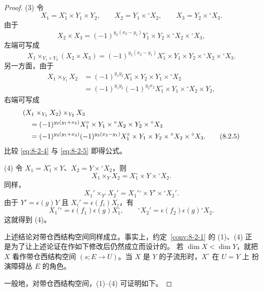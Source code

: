 \begin{proof}
\textup{(3)} 令
\[
 X_1=X_1^\circ\times Y_1\times Y_2,
 \qquad X_2=Y_1\times{}^\circ X_2,
 \qquad X_3=Y_2\times{}^\circ X_3.
\]
由于
\[
 X_2\times X_3
 =(-1)^{y_2(x_2-y_1)}
 Y_1\times Y_2\times{}^\circ X_2\times{}^\circ X_3,
\]
左端可写成
\begin{equation}
 X_1\times_{Y_1\times Y_2}(X_2\times X_3)
 =(-1)^{y_2(x_2-y_1)}
 X_1^\circ\times Y_1\times Y_2
 \times{}^\circ X_2\times{}^\circ X_3.
 \tag{8.2.4}\label{eq:8-2-4}
\end{equation}
另一方面，由于
\[
\begin{aligned}
 X_1\times_{Y_1}X_2
 &=(-1)^{y_1y_2}
 X_1^\circ\times Y_2\times Y_1\times{}^\circ X_2\\
 &=(-1)^{y_1y_2}(-1)^{y_2x_2}
 X_1^\circ\times Y_1\times{}^\circ X_2\times Y_2,
\end{aligned}
\]
右端可写成
\begin{align}
 &(X_1\times_{Y_1}X_2)\times_{Y_2}X_3\notag\\
 &\quad=(-1)^{y_2(y_1+x_2)}
 X_1^\circ\times Y_1\times{}^\circ X_2\times Y_2\times{}^\circ X_3
 \notag\\
 &\quad=(-1)^{y_2(y_1+x_2)}(-1)^{y_2(x_2-y_1)}
 X_1^\circ\times Y_1\times Y_2
 \times{}^\circ X_2\times{}^\circ X_3.
 \tag{8.2.5}\label{eq:8-2-5}
\end{align}
比较 \eqref{eq:8-2-4} 与 \eqref{eq:8-2-5} 即得公式。

\textup{(4)} 令
$X_1=X_1^\circ\times Y$、$X_2=Y\times{}^\circ X_2$，则
\[
 X_1\times_YX_2=X_1^\circ\times Y\times{}^\circ X_2.
\]
同样，
\[
 X_1'\times_{Y'}X_2'=X_1'{}^\circ\times Y'\times{}^\circ X_2'.
\]
由于 $Y'=\epsilon(g)Y$ 且 $X_i'=\epsilon(f_i)X_i$，有
\[
 X_1'{}^\circ=\epsilon(f_1)\epsilon(g)X_1^\circ,
 \qquad
 {}^\circ X_2'=\epsilon(f_2)\epsilon(g){}^\circ X_2.
\]
这就得到 (4)。

上述结论对带仓西结构空间同样成立。事实上，约定~\ref{conv:8-2-1}
的 (1)、(4) 正是为了让上述论证在作如下修改后仍然成立而设计的。
若 $\dim X<\dim Y$，就把 $X$ 看作带仓西结构空间
$(s;E\to U)$。当 $X$ 是 $Y$ 的子流形时，$X^\circ$ 在 $U=Y$ 上
扮演障碍丛 $E$ 的角色。

一般地，对带仓西结构空间，(1)--(4) 可证明如下。


\end{proof}
